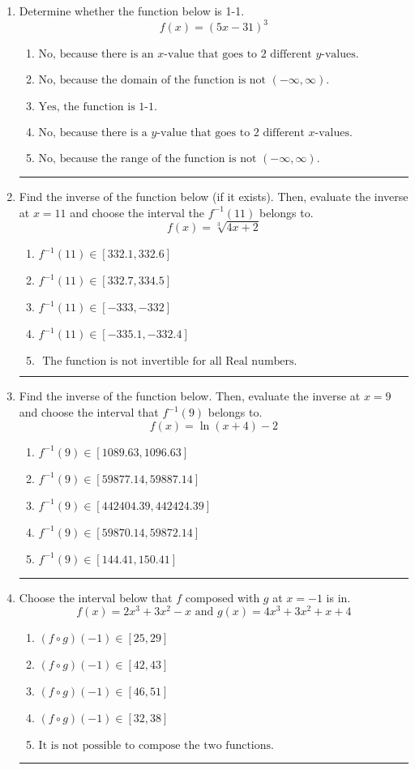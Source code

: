 \documentclass[14pt]{extbook}
\newcommand{\litem}[1]{\item#1\hspace*{-1cm}\rule{\textwidth}{0.4pt}}
\begin{document}
\begin{enumerate}
{\begin{enumerate}[label=\Alph*.]
\end{enumerate} }
\litem{
Determine whether the function below is 1-1.\[ f(x) = (5 x - 31)^3 \]\begin{enumerate}[label=\Alph*.]
\item \( \text{No, because there is an $x$-value that goes to 2 different $y$-values.} \)
\item \( \text{No, because the domain of the function is not $(-\infty, \infty)$.} \)
\item \( \text{Yes, the function is 1-1.} \)
\item \( \text{No, because there is a $y$-value that goes to 2 different $x$-values.} \)
\item \( \text{No, because the range of the function is not $(-\infty, \infty)$.} \)

\end{enumerate} }
\litem{
Find the inverse of the function below (if it exists). Then, evaluate the inverse at $x = 11$ and choose the interval the $f^{-1}(11)$ belongs to.\[ f(x) = \sqrt[3]{4 x + 2} \]\begin{enumerate}[label=\Alph*.]
\item \( f^{-1}(11) \in [332.1, 332.6] \)
\item \( f^{-1}(11) \in [332.7, 334.5] \)
\item \( f^{-1}(11) \in [-333, -332] \)
\item \( f^{-1}(11) \in [-335.1, -332.4] \)
\item \( \text{ The function is not invertible for all Real numbers. } \)

\end{enumerate} }
\litem{
Find the inverse of the function below. Then, evaluate the inverse at $x = 9$ and choose the interval that $f^{-1}(9)$ belongs to.\[ f(x) = \ln{(x+4)}-2 \]\begin{enumerate}[label=\Alph*.]
\item \( f^{-1}(9) \in [1089.63, 1096.63] \)
\item \( f^{-1}(9) \in [59877.14, 59887.14] \)
\item \( f^{-1}(9) \in [442404.39, 442424.39] \)
\item \( f^{-1}(9) \in [59870.14, 59872.14] \)
\item \( f^{-1}(9) \in [144.41, 150.41] \)

\end{enumerate} }
\litem{
Choose the interval below that $f$ composed with $g$ at $x=-1$ is in.\[ f(x) = 2x^{3} +3 x^{2} -x \text{ and } g(x) = 4x^{3} +3 x^{2} +x + 4 \]\begin{enumerate}[label=\Alph*.]
\item \( (f \circ g)(-1) \in [25, 29] \)
\item \( (f \circ g)(-1) \in [42, 43] \)
\item \( (f \circ g)(-1) \in [46, 51] \)
\item \( (f \circ g)(-1) \in [32, 38] \)
\item \( \text{It is not possible to compose the two functions.} \)

\end{enumerate} }
\end{enumerate}
\end{document}
